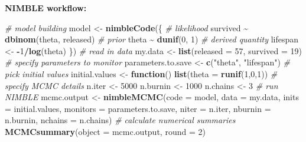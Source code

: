 \documentclass[
  12pt,
]{krantz}
\newenvironment{Shaded}{\begin{snugshade}}{\end{snugshade}}
\newcommand{\AttributeTok}[1]{\textcolor[rgb]{0.13,0.29,0.53}{#1}}
\newcommand{\CommentTok}[1]{\textcolor[rgb]{0.56,0.35,0.01}{\textit{#1}}}
\newcommand{\ControlFlowTok}[1]{\textcolor[rgb]{0.13,0.29,0.53}{\textbf{#1}}}
\newcommand{\DecValTok}[1]{\textcolor[rgb]{0.00,0.00,0.81}{#1}}
\newcommand{\FunctionTok}[1]{\textcolor[rgb]{0.13,0.29,0.53}{\textbf{#1}}}
\newcommand{\NormalTok}[1]{#1}
\newcommand{\OtherTok}[1]{\textcolor[rgb]{0.56,0.35,0.01}{#1}}
\newcommand{\SpecialCharTok}[1]{\textcolor[rgb]{0.81,0.36,0.00}{\textbf{#1}}}
\newcommand{\StringTok}[1]{\textcolor[rgb]{0.31,0.60,0.02}{#1}}
\begin{document}
\begin{blackbox}

\textbf{NIMBLE workflow:}

\begin{Shaded}
\begin{Highlighting}[]
\CommentTok{\# model building}
\NormalTok{model }\OtherTok{\textless{}{-}} \FunctionTok{nimbleCode}\NormalTok{(\{}
  \CommentTok{\# likelihood}
\NormalTok{  survived }\SpecialCharTok{\textasciitilde{}} \FunctionTok{dbinom}\NormalTok{(theta, released)}
  \CommentTok{\# prior}
\NormalTok{  theta }\SpecialCharTok{\textasciitilde{}} \FunctionTok{dunif}\NormalTok{(}\DecValTok{0}\NormalTok{, }\DecValTok{1}\NormalTok{)}
  \CommentTok{\# derived quantity}
\NormalTok{  lifespan }\OtherTok{\textless{}{-}} \SpecialCharTok{{-}}\DecValTok{1}\SpecialCharTok{/}\FunctionTok{log}\NormalTok{(theta)}
\NormalTok{\})}
\CommentTok{\# read in data}
\NormalTok{my.data }\OtherTok{\textless{}{-}} \FunctionTok{list}\NormalTok{(}\AttributeTok{released =} \DecValTok{57}\NormalTok{, }\AttributeTok{survived =} \DecValTok{19}\NormalTok{)}
\CommentTok{\# specify parameters to monitor}
\NormalTok{parameters.to.save }\OtherTok{\textless{}{-}} \FunctionTok{c}\NormalTok{(}\StringTok{"theta"}\NormalTok{, }\StringTok{"lifespan"}\NormalTok{)}
\CommentTok{\# pick initial values}
\NormalTok{initial.values }\OtherTok{\textless{}{-}} \ControlFlowTok{function}\NormalTok{() }\FunctionTok{list}\NormalTok{(}\AttributeTok{theta =} \FunctionTok{runif}\NormalTok{(}\DecValTok{1}\NormalTok{,}\DecValTok{0}\NormalTok{,}\DecValTok{1}\NormalTok{))}
\CommentTok{\# specify MCMC details}
\NormalTok{n.iter }\OtherTok{\textless{}{-}} \DecValTok{5000}
\NormalTok{n.burnin }\OtherTok{\textless{}{-}} \DecValTok{1000}
\NormalTok{n.chains }\OtherTok{\textless{}{-}} \DecValTok{3}
\CommentTok{\# run NIMBLE}
\NormalTok{mcmc.output }\OtherTok{\textless{}{-}} \FunctionTok{nimbleMCMC}\NormalTok{(}\AttributeTok{code =}\NormalTok{ model,}
                          \AttributeTok{data =}\NormalTok{ my.data,}
                          \AttributeTok{inits =}\NormalTok{ initial.values,}
                          \AttributeTok{monitors =}\NormalTok{ parameters.to.save,}
                          \AttributeTok{niter =}\NormalTok{ n.iter,}
                          \AttributeTok{nburnin =}\NormalTok{ n.burnin,}
                          \AttributeTok{nchains =}\NormalTok{ n.chains)}
\CommentTok{\# calculate numerical summaries}
\FunctionTok{MCMCsummary}\NormalTok{(}\AttributeTok{object =}\NormalTok{ mcmc.output, }\AttributeTok{round =} \DecValTok{2}\NormalTok{)}

\end{Highlighting}
\end{Shaded}
\end{blackbox}
\end{document}

